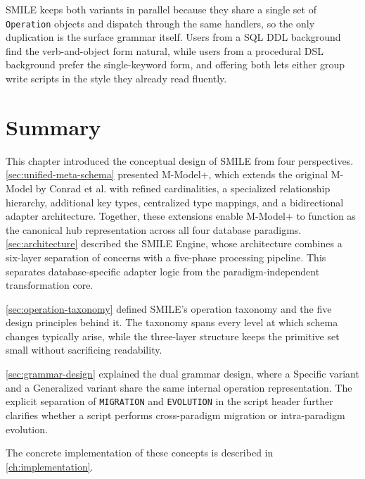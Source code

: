   SMILE keeps both variants in parallel because they share a single set of \texttt{Operation}
  objects and dispatch through the same handlers, so the only duplication is the surface grammar
  itself. Users from a SQL DDL background find the verb-and-object form natural, while users from
  a procedural DSL background prefer the single-keyword form, and offering both lets either group
  write scripts in the style they already read fluently.
\section{Summary}\label{sec:concept-summary}

  This chapter introduced the conceptual design of SMILE  from four perspectives. \autoref{sec:unified-meta-schema} presented M-Model+, which extends the original M-Model
  by Conrad et al. with refined cardinalities, a specialized relationship hierarchy, additional key types, centralized type mappings, and a bidirectional adapter
  architecture. Together, these extensions enable M-Model+ to function as the canonical hub representation across all four database paradigms.
  \autoref{sec:architecture} described the SMILE  Engine, whose architecture combines a six-layer separation of concerns with a five-phase processing pipeline. This separates database-specific adapter logic from the paradigm-independent transformation core.

\autoref{sec:operation-taxonomy} defined SMILE's operation taxonomy and the five design principles  behind it. The taxonomy spans every level at which schema changes typically arise, while the three-layer structure keeps the primitive set small without sacrificing readability.

  \autoref{sec:grammar-design} explained the dual grammar design, where a Specific variant and a Generalized variant share the same internal operation representation.
  The explicit separation of \texttt{MIGRATION} and \texttt{EVOLUTION} in the script header further clarifies whether a script performs cross-paradigm migration or
  intra-paradigm evolution.

  The concrete implementation of these concepts is described in \autoref{ch:implementation}.



